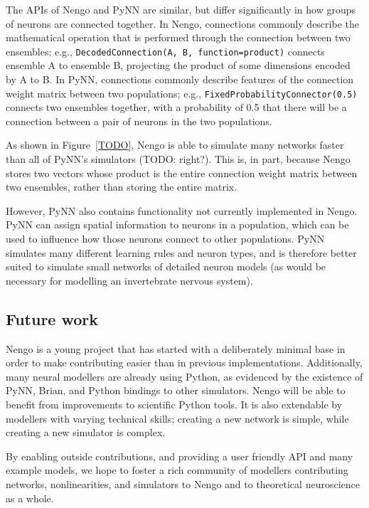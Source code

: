 \documentclass{frontiersSCNS}
\begin{document}
The APIs of Nengo and PyNN are similar,
but differ significantly
in how groups of neurons are connected together.
In Nengo, connections commonly describe
the mathematical operation that is performed
through the connection between
two ensembles;
e.g., \texttt{DecodedConnection(A, B,
function=product)} connects ensemble A
to ensemble B, projecting the product of
some dimensions encoded by A to B.
In PyNN, connections commonly describe
features of the connection weight matrix
between two populations;
e.g., \texttt{FixedProbabilityConnector(0.5)}
connects two ensembles together,
with a probability of 0.5
that there will be a connection
between a pair of neurons in the two populations.

As shown in Figure~\ref{TODO},
Nengo is able to simulate many networks
faster than all of PyNN's simulators
(TODO: right?).
This is, in part, because Nengo stores two vectors
whose product is the entire
connection weight matrix between
two ensembles, rather than storing
the entire matrix.

However, PyNN also contains functionality
not currently implemented in Nengo.
PyNN can assign spatial information
to neurons in a population,
which can be used to influence
how those neurons connect to other populations.
PyNN simulates many different learning rules
and neuron types,
and is therefore better suited to
simulate small networks of detailed neuron models
(as would be necessary for modelling
an invertebrate nervous system).

\subsection{Future work}

Nengo is a young project that
has started with a deliberately minimal base
in order to make contributing easier than in
previous implementations.
Additionally, many neural modellers
are already using Python,
as evidenced by the existence of
PyNN, Brian, and Python bindings to other simulators.
Nengo will be able to benefit
from improvements to scientific Python tools.
It is also extendable by modellers with
varying technical skills;
creating a new network is simple,
while creating a new simulator is complex.

By enabling outside contributions,
and providing a user friendly API
and many example models,
we hope to foster a rich community of modellers
contributing networks, nonlinearities,
and simulators to Nengo
and to theoretical neuroscience
as a whole.
\end{document}
